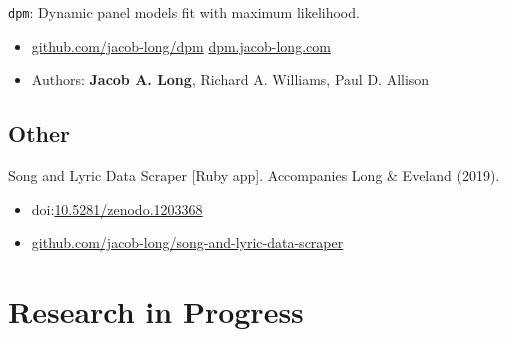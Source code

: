 \documentclass[letterpaper,MMMyyyy,nonstopmode]{simplecv}
\def\tightlist{} %
\begin{document}
\begin{Body}
\normalsize

\texttt{dpm}: Dynamic panel models fit with maximum likelihood. \small 
\vspace{-.05in}

\begin{itemize}
\item
  \faGithub \hspace{.02in}
  \href{https://github.com/jacob-long/dpm}{github.com/jacob-long/dpm}
  \hspace{.03in} \textbullet \hspace{.05in} \faGlobe \hspace{.02in}
  \href{https://dpm.jacob-long.com}{dpm.jacob-long.com}
\item
  Authors: \textbf{Jacob A. Long}, Richard A. Williams, Paul D. Allison
\end{itemize}

\normalsize

\hypertarget{other}{%
\subsection{Other}\label{other}}

Song and Lyric Data Scraper {[}Ruby app{]}. Accompanies Long \& Eveland
(2019).

\vspace{-.05in}

\begin{itemize}
\tightlist
\item
  doi:\href{https://doi.org/10.5281/zenodo.1203368}{10.5281/zenodo.1203368}
\end{itemize}

\small 
\vspace{-.07in}

\begin{itemize}
\tightlist
\item
  \faGithub \hspace{.02in}
  \href{https://github.com/jacob-long/song-and-lyric-data-scraper}{github.com/jacob-long/song-and-lyric-data-scraper}
\end{itemize}

\normalsize

\hypertarget{research-in-progress}{%
\section{Research in Progress}\label{research-in-progress}}



\end{Body}
\end{document}
